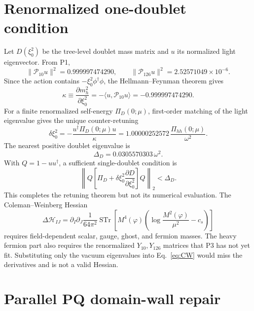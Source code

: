 \documentclass[11pt]{article}
\newcommand{\cP}{\mathcal P}
\newcommand{\cH}{\mathcal H}
\begin{document}
\section{Renormalized one-doublet condition}

Let $D(\xi_0^2)$ be the tree-level doublet mass matrix and $u$ its normalized
light eigenvector.  From P1,
\begin{equation}
 \|\cP_{10}u\|^2=0.999997474290,\qquad
 \|\cP_{126}u\|^2=2.52571049\times10^{-6}.
 \label{eq:doubletweights}
\end{equation}
Since the action contains $-\xi_0^2\phi^\dagger\phi$, the
Hellmann--Feynman theorem gives
\begin{equation}
 \kappa\equiv\frac{\partial m_h^2}{\partial\xi_0^2}
 =-\langle u,\cP_{10}u\rangle=-0.999997474290.
 \label{eq:kappa}
\end{equation}
For a finite renormalized self-energy $\Pi_D(0;\mu)$, first-order matching of
the light eigenvalue gives the unique counter-retuning
\begin{equation}
 \boxed{
 \delta\xi_0^2
 =-\frac{u^\dagger\Pi_D(0;\mu)u}{\kappa}
 =1.00000252572\,\frac{\Pi_{hh}(0;\mu)}{\omega^2}.}
 \label{eq:retune}
\end{equation}
The nearest positive doublet eigenvalue is
\begin{equation}
 \Delta_D=0.0305570303\,\omega^2.
 \label{eq:doubletgap}
\end{equation}
With $Q=1-uu^\dagger$, a sufficient single-doublet condition is
\begin{equation}
 \left\|Q\left[\Pi_D+\delta\xi_0^2
 \frac{\partial D}{\partial\xi_0^2}\right]Q\right\|_2<\Delta_D.
 \label{eq:gapcriterion}
\end{equation}
This completes the retuning theorem but not its numerical evaluation.  The
Coleman--Weinberg Hessian
\begin{equation}
 \Delta\cH_{IJ}=\partial_I\partial_J
 \frac{1}{64\pi^2}\operatorname{STr}\left[
 M^4(\varphi)\left(\log\frac{M^2(\varphi)}{\mu^2}-c_s\right)\right]
 \label{eq:CW}
\end{equation}
requires field-dependent scalar, gauge, ghost, and fermion masses.  The
heavy fermion part also requires the renormalized $Y_{10},Y_{126}$ matrices
that P3 has not yet fit.  Substituting only the vacuum eigenvalues into
Eq.~\eqref{eq:CW} would miss the derivatives and is not a valid Hessian.

\section{Parallel PQ domain-wall repair}
\end{document}
